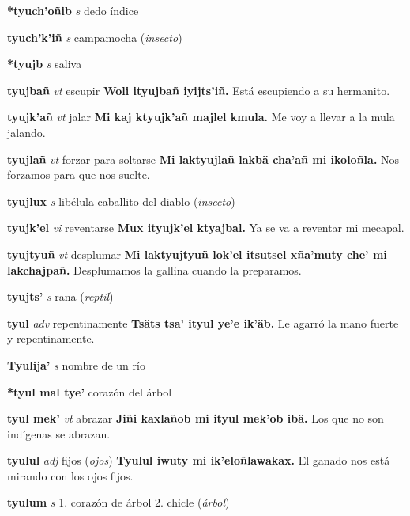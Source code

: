 \documentclass[10pt]{scrbook}
\newcommand{\entry}[1]{\textbf{#1}}
\newcommand{\onedefinition}[1]{#1.}
\newcommand{\partofspeech}[1]{\textit{#1}}
\newcommand{\spanishtranslation}[1]{#1}
\newcommand{\clarification}[1]{(\textit{#1})}
\newcommand{\cholexample}[1]{\textbf{#1}}
\newcommand{\exampletranslation}[1]{#1}
\begin{document}
\begin{multicols}{2}
\entry{*tyuch'oñib}
\partofspeech{s}
\spanishtranslation{dedo índice}

\entry{tyuch'k'iñ}
\partofspeech{s}
\spanishtranslation{campamocha}
\clarification{insecto}

\entry{*tyujb}
\partofspeech{s}
\spanishtranslation{saliva}

\entry{tyujbañ}
\partofspeech{vt}
\spanishtranslation{escupir}
\cholexample{Woli ityujbañ iyijts'iñ.}
\exampletranslation{Está escupiendo a su hermanito.}

\entry{tyujk'añ}
\partofspeech{vt}
\spanishtranslation{jalar}
\cholexample{Mi kaj ktyujk'añ majlel kmula.}
\exampletranslation{Me voy a llevar a la mula jalando.}

\entry{tyujlañ}
\partofspeech{vt}
\spanishtranslation{forzar para soltarse}
\cholexample{Mi laktyujlañ lakbä cha'añ mi ikoloñla.}
\exampletranslation{Nos forzamos para que nos suelte.}

\entry{tyujlux}
\partofspeech{s}
\spanishtranslation{libélula}
\spanishtranslation{caballito del diablo}
\clarification{insecto}

\entry{tyujk'el}
\partofspeech{vi}
\spanishtranslation{reventarse}
\cholexample{Mux ityujk'el ktyajbal.}
\exampletranslation{Ya se va a reventar mi mecapal.}

\entry{tyujtyuñ}
\partofspeech{vt}
\spanishtranslation{desplumar}
\cholexample{Mi laktyujtyuñ lok'el itsutsel xña'muty che' mi lakchajpañ.}
\exampletranslation{Desplumamos la gallina cuando la preparamos.}

\entry{tyujts'}
\partofspeech{s}
\spanishtranslation{rana}
\clarification{reptil}

\entry{tyul}
\partofspeech{adv}
\spanishtranslation{repentinamente}
\cholexample{Tsäts tsa' ityul ye'e ik'äb.}
\exampletranslation{Le agarró la mano fuerte y repentinamente.}

\entry{Tyulija'}
\partofspeech{s}
\spanishtranslation{nombre de un río}

\entry{*tyul mal tye'}
\spanishtranslation{corazón del árbol}

\entry{tyul mek'}
\partofspeech{vt}
\spanishtranslation{abrazar}
\cholexample{Jiñi kaxlañob mi ityul mek'ob ibä.}
\exampletranslation{Los que no son indígenas se abrazan.}

\entry{tyulul}
\partofspeech{adj}
\spanishtranslation{fijos}
\clarification{ojos}
\cholexample{Tyulul iwuty mi ik'eloñlawakax.}
\exampletranslation{El ganado nos está mirando con los ojos fijos.}

\entry{tyulum}
\partofspeech{s}
\onedefinition{1}
\spanishtranslation{corazón de árbol}
\onedefinition{2}
\spanishtranslation{chicle}
\clarification{árbol}


\end{multicols}
\end{document}
